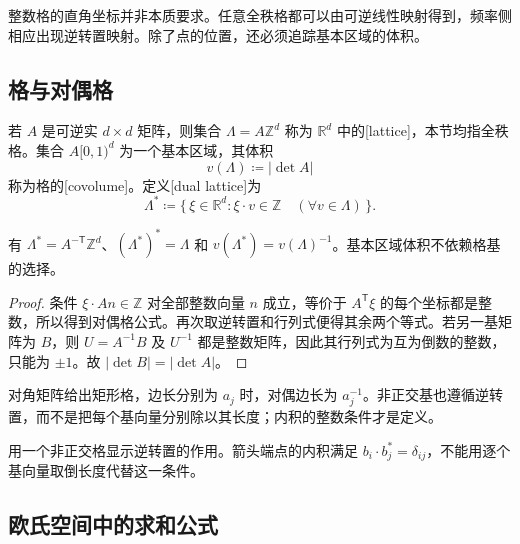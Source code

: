 
整数格的直角坐标并非本质要求。任意全秩格都可以由可逆线性映射得到，频率侧相应出现逆转置映射。除了点的位置，还必须追踪基本区域的体积。

\subsection{格与对偶格}
\label{b2:subsec:060401}

\begin{definition}\label{b2:def:06-lattice}
若 \(A\) 是可逆实 \(d\times d\) 矩阵，则集合 \(\Lambda=A\mathbb Z^d\) 称为 \(\mathbb R^d\) 中的[lattice]，本节均指全秩格。集合 \(A[0,1)^d\) 为一个基本区域，其体积
\[
 v(\Lambda)\coloneqq|\det A|
\]
称为格的[covolume]。定义[dual lattice]为
\[
 \Lambda^*\coloneqq\{\,\xi\in\mathbb R^d:\xi\cdot v\in\mathbb Z\quad(\forall v\in\Lambda)\,\}.
\]
\end{definition}

\begin{proposition}\label{b2:prop:06-dual-lattice}
有 \(\Lambda^*=A^{-\mathsf T}\mathbb Z^d\)、\((\Lambda^*)^*=\Lambda\) 和 \(v(\Lambda^*)=v(\Lambda)^{-1}\)。基本区域体积不依赖格基的选择。
\end{proposition}
\begin{proof}
条件 \(\xi\cdot An\in\mathbb Z\) 对全部整数向量 \(n\) 成立，等价于 \(A^{\mathsf T}\xi\) 的每个坐标都是整数，所以得到对偶格公式。再次取逆转置和行列式便得其余两个等式。若另一基矩阵为 \(B\)，则 \(U=A^{-1}B\) 及 \(U^{-1}\) 都是整数矩阵，因此其行列式为互为倒数的整数，只能为 \(\pm1\)。故 \(|\det B|=|\det A|\)。
\end{proof}

对角矩阵给出矩形格，边长分别为 \(a_j\) 时，对偶边长为 \(a_j^{-1}\)。非正交基也遵循逆转置，而不是把每个基向量分别除以其长度；内积的整数条件才是定义。

用一个非正交格显示逆转置的作用。箭头端点的内积满足 \(b_i\cdot b_j^*=\delta_{ij}\)，不能用逐个基向量取倒长度代替这一条件。


\subsection{欧氏空间中的求和公式}
\label{b2:subsec:060402}

